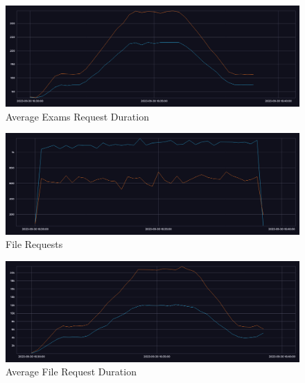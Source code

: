 \documentclass[BIF,Bachelor,nenglish]{twbook}%
\begin{document}
\begin{figure} [H]
 \begin{center}
    \includegraphics[width=1\linewidth]{img/Exams_Duration_15s_Compare.png}
 \end{center}
 \caption{Average Exams Request Duration}
 \label{examsDuration}
\end{figure}


\begin{figure} [H]
 \begin{center}
    \includegraphics[width=1\linewidth]{img/File_Requests_15s_Compare.png}
 \end{center}
 \caption{File Requests}
 \label{fileRequests}
\end{figure}


\begin{figure} [H]
 \begin{center}
    \includegraphics[width=1\linewidth]{img/File_Duration_15s_Compare.png}
 \end{center}
 \caption{Average File Request Duration}
 \label{fileDuration}
\end{figure}
\end{document}
